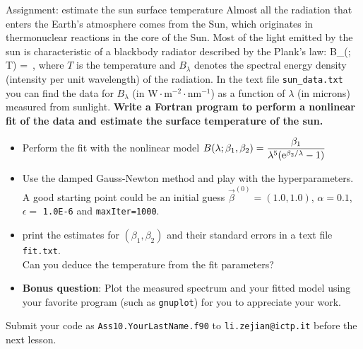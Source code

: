 \documentclass[10pt,aspectratio=169,handout]{beamer}
\begin{document}
\begin{frame}{Assignment: estimate the sun surface temperature}
	Almost all the radiation that enters the Earth's atmosphere comes from the Sun, which originates in thermonuclear reactions in the core of the Sun. Most of the light emitted by the sun is characteristic of a blackbody radiator described by the Plank's law:
	\vspace{-0.2cm}
	\bea
		 B_\lambda(\lambda; T) = \,,
	\eea
	where $T$ is the temperature and $B_\lambda$ denotes the spectral energy density (intensity per unit wavelength) of the radiation. In the text file \texttt{sun\_data.txt} you can find the data for $B_\lambda$ (in $\mathrm{W}\cdot\mathrm{m}^{-2}\cdot\mathrm{nm}^{-1}$) as a function of $\lambda$ (in microns) measured from sunlight.
	 \textbf{Write a Fortran program to perform a nonlinear fit of the data and estimate the surface temperature of the sun.}\\ \pause
	\begin{itemize}[<+->]
		\item Perform the fit with the nonlinear model $ B(\lambda;\beta_1,\beta_2) = \dfrac{\beta_1}{\lambda^5( {\rm {e}}^{\beta_2/\lambda}-1)}$ 
		\item Use the damped Gauss-Newton method and play with the hyperparameters. A good starting point could be an initial guess $\vec{\beta}^{(0)} = (1.0,1.0)$,  $\alpha=0.1$,  $\epsilon =$ \texttt{1.0E-6} and \texttt{maxIter=1000}.
		 \item print the estimates for $(\beta_1,\beta_2)$ and their standard errors in a text file \texttt{fit.txt}. \\Can you deduce the temperature from the fit parameters?
		\item 	\textbf{Bonus question}: Plot the measured spectrum and your fitted model using your favorite program (such as \texttt{gnuplot}) for you to appreciate your work.
	\end{itemize}
Submit your code as \texttt{Ass10.YourLastName.f90} to \texttt{li.zejian@ictp.it} before the next lesson.
\end{frame}
\end{document}
